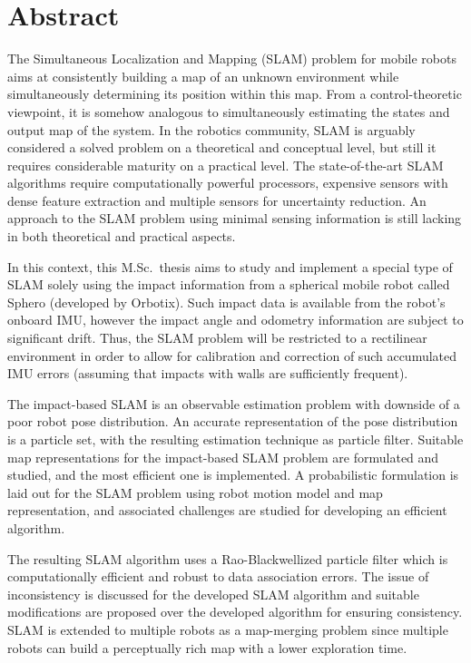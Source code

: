 \chapter*{Abstract}%
The Simultaneous Localization and Mapping (SLAM) problem for mobile robots aims at consistently building a map of an unknown environment while simultaneously determining its position within this map. From a control-theoretic viewpoint, it is somehow analogous to simultaneously estimating the states and output map of the system. In the robotics community, SLAM is arguably considered a solved problem on a theoretical and conceptual level, but still it requires considerable maturity on a practical level. The state-of-the-art SLAM algorithms require computationally powerful processors, expensive sensors with dense feature extraction and multiple sensors for uncertainty reduction. An approach to the SLAM problem using minimal sensing information is still lacking in both theoretical and practical aspects. 

In this context, this M.Sc.\ thesis aims to study and implement a special type of SLAM solely using the impact information from a spherical mobile robot called Sphero (developed by Orbotix). Such impact data is available from the robot's onboard \acf{IMU}, however the impact angle and odometry information are subject to significant drift. Thus, the SLAM problem will be restricted to a rectilinear environment in order to allow for calibration and correction of such accumulated IMU errors (assuming that impacts with walls are sufficiently frequent). 

The impact-based SLAM is an observable estimation problem with downside of a poor robot pose distribution. An accurate representation of the pose distribution is a particle set, with the resulting estimation technique as particle filter. Suitable map representations for the impact-based SLAM problem are formulated and studied, and the most efficient one is implemented. A probabilistic formulation is laid out for the SLAM problem using robot motion model and map representation, and associated challenges are studied for developing an efficient algorithm.

The resulting SLAM algorithm uses a Rao-Blackwellized particle filter which is computationally efficient and robust to data association errors. The issue of inconsistency is discussed for the developed SLAM algorithm and suitable modifications are proposed over the developed algorithm for ensuring consistency. SLAM is extended to multiple robots as a map-merging problem since multiple robots can build a perceptually rich map with a lower exploration time.